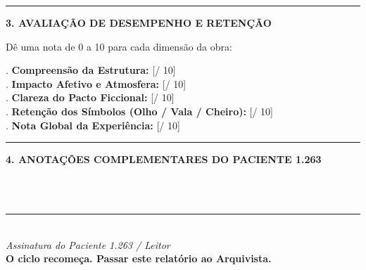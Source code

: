 \vspace{0.8em}
\noindent\rule{\textwidth}{0.5pt}
\vspace{0.5em}

\noindent\textbf{3. AVALIAÇÃO DE DESEMPENHO E RETENÇÃO}

\vspace{0.4em}
\noindent Dê uma nota de 0 a 10 para cada dimensão da obra:

\vspace{0.3em}
. \textbf{Compreensão da Estrutura:} [\qquad / 10]\\[0.25em]
. \textbf{Impacto Afetivo e Atmosfera:} [\qquad / 10]\\[0.25em]
. \textbf{Clareza do Pacto Ficcional:} [\qquad / 10]\\[0.25em]
. \textbf{Retenção dos Símbolos (Olho / Vala / Cheiro):} [\qquad / 10]\\[0.25em]
. \textbf{Nota Global da Experiência:} [\qquad / 10]

\vspace{1em}
\noindent\rule{\textwidth}{0.5pt}
\vspace{0.5em}

\noindent\textbf{4. ANOTAÇÕES COMPLEMENTARES DO PACIENTE 1.263}

\vspace{0.5em}
\noindent\dotfill\\[0.4em]
\noindent\dotfill\\[0.4em]
\noindent\dotfill

\vspace{1.5em}
\begin{center}
\rule{0.5\textwidth}{0.5pt}\\[0.4em]
\textit{Assinatura do Paciente 1.263 / Leitor}\\[0.3em]
{\small\textcolor{sangue}{\textbf{O ciclo recomeça. Passar este relatório ao Arquivista.}}}
\end{center}

\endgroup
\clearpage

